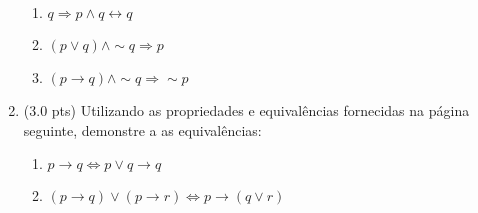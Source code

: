 \documentclass[12pt]{article}
\begin{document}
\begin{enumerate}
\begin{enumerate}
\setlength{\itemsep}{-2pt}

\item $q \Rightarrow p \wedge q
\leftrightarrow q$

\item  $ (p \vee q) \wedge \sim q \Rightarrow p $

\item $(p \rightarrow q) \wedge \sim q \Rightarrow \sim p$

\end{enumerate}


\item (3.0 pts) Utilizando as propriedades e equivalências
fornecidas na página seguinte, demonstre a
as equivalências:

\begin{enumerate}
\setlength{\itemsep}{-2pt}

\item $p \rightarrow q \Leftrightarrow p \vee q \rightarrow  q$ %

\item  $(p \rightarrow q) \vee (p \rightarrow r) \Leftrightarrow p  \rightarrow  (q \vee r) $ %

\end{enumerate}






\end{enumerate}
\newpage

\end{document}
